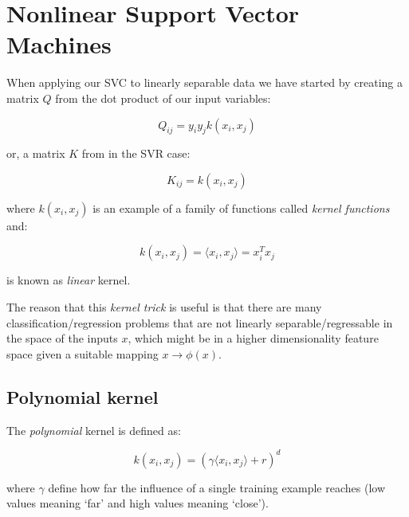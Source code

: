 \section{Nonlinear Support Vector Machines}

When applying our SVC to linearly separable data we have started by creating a matrix $Q$ from the dot product of our input variables:

\begin{equation} \label{eq:svc_hessian}
	Q_{ij}=y_i y_j 	k(x_i,x_j)
\end{equation}

or, a matrix $K$ from in the SVR case:

\begin{equation} \label{eq:svr_hessian}
	K_{ij}=k(x_i,x_j)
\end{equation}

where $k(x_i,x_j)$ is an example of a family of functions called \emph{kernel functions} and:  

\begin{equation} \label{eq:kernel_function}
	k(x_i,x_j)=\langle x_i, x_j \rangle= x_i^T x_j
\end{equation}

is known as \emph{linear} kernel.

The reason that this \emph{kernel trick} is useful is that there are many classification/regression problems that are not linearly separable/regressable in the space of the inputs $x$, which might be in a higher dimensionality feature space given a suitable mapping $x \rightarrow \phi(x)$.

\subsection{Polynomial kernel}

The \emph{polynomial} kernel is defined as:

\begin{equation} \label{eq:poly_kernel}
	k(x_i,x_j)=(\gamma \langle x_i, x_j\rangle + r)^d
\end{equation}

where $\gamma$ define how far the influence of a single training example reaches (low values meaning ‘far’ and high values meaning ‘close’).


